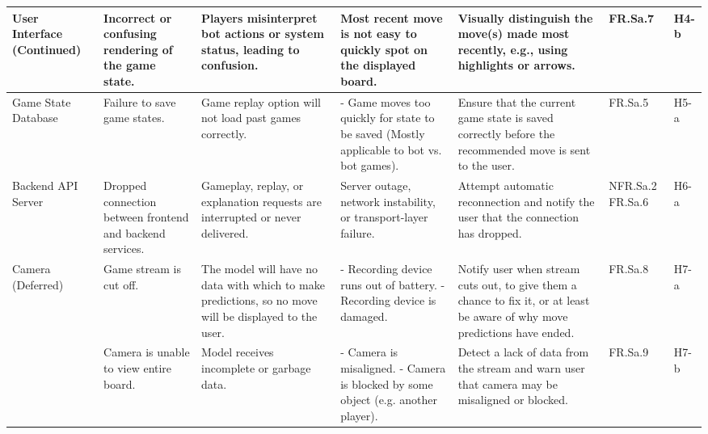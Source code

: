 \documentclass{article}
\begin{document}
\begin{landscape}
\begin{tabularx}{\linewidth}{|P{2.3cm}|Y|Y|Y|Y|P{1.4cm}|P{0.8cm}|}
        User Interface (Continued) &
        Incorrect or confusing rendering of the game state. &
        Players misinterpret bot actions or system status, leading to confusion. &
        Most recent move is not easy to quickly spot on the displayed board. &
        Visually distinguish the move(s) made most recently, e.g., using highlights or arrows. &
        FR.Sa.7 &
        H4-b \\

        \hline

        Game State Database &
        Failure to save game states. &
        Game replay option will not load past games correctly. &
        - Game moves too quickly for state to be saved (Mostly applicable to bot vs. bot games). &
        Ensure that the current game state is saved correctly before the recommended move is sent to the user. &
        FR.Sa.5 &
        H5-a \\

        \hline

        Backend API Server &
        Dropped connection between frontend and backend services. &
        Gameplay, replay, or explanation requests are interrupted or never delivered. &
        Server outage, network instability, or transport-layer failure. &
        Attempt automatic reconnection and notify the user that the connection has dropped. &
        NFR.Sa.2 \newline FR.Sa.6 &
        H6-a \\

        \hline

        Camera (Deferred) &
        Game stream is cut off. &
        The model will have no data with which to make predictions, so no move will be displayed to the user. &
        - Recording device runs out of battery. \newline - Recording device is damaged. &
        Notify user when stream cuts out, to give them a chance to fix it, or at least be aware of why move predictions have ended. &
        FR.Sa.8 &
        H7-a \\

        &
        Camera is unable to view entire board. &
        Model receives incomplete or garbage data. &
        - Camera is misaligned. \newline - Camera is blocked by some object (e.g. another player). &
        Detect a lack of data from the stream and warn user that camera may be misaligned or blocked. &
        FR.Sa.9 &
        H7-b \\


\end{tabularx}
\end{landscape}
\end{document}
